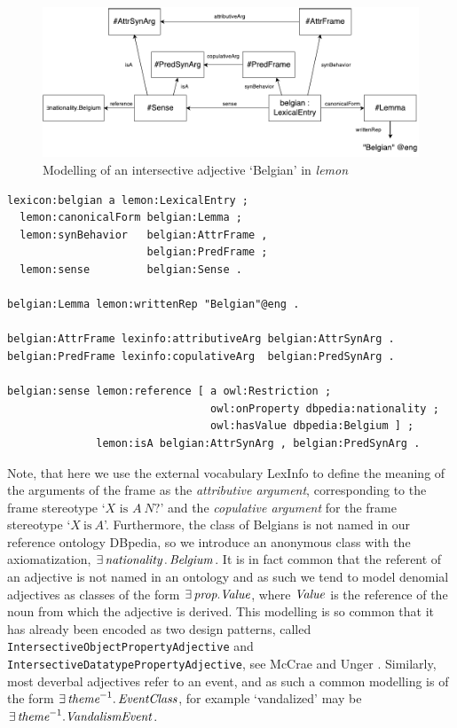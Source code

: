 \documentclass[11pt]{article}
\begin{document}
\begin{figure}
\includegraphics[width=\textwidth]{belgian-example}
\caption{Modelling of an intersective adjective `Belgian' in \emph{lemon}\label{example-belgian}}
\end{figure}

\begin{small}\begin{verbatim}
lexicon:belgian a lemon:LexicalEntry ;
  lemon:canonicalForm belgian:Lemma ;
  lemon:synBehavior   belgian:AttrFrame , 
                      belgian:PredFrame ;
  lemon:sense         belgian:Sense .

belgian:Lemma lemon:writtenRep "Belgian"@eng .

belgian:AttrFrame lexinfo:attributiveArg belgian:AttrSynArg .
belgian:PredFrame lexinfo:copulativeArg  belgian:PredSynArg .

belgian:sense lemon:reference [ a owl:Restriction ;
                                owl:onProperty dbpedia:nationality ;
                                owl:hasValue dbpedia:Belgium ] ;
              lemon:isA belgian:AttrSynArg , belgian:PredSynArg .
\end{verbatim}\end{small}

Note, that here we use the external vocabulary LexInfo \cite{cimiano2011lexinfo} 
to define the meaning of the arguments of the frame as the \emph{attributive 
argument}, corresponding to the frame stereotype `$X\text{ is }A~N?$' and the 
\emph{copulative argument} for the frame stereotype `$X\mathrm{~is~}A$'. Furthermore,
the class of Belgians is not named in our reference ontology DBpedia, so we 
introduce an anonymous class with the axiomatization, 
$\exists\,\text{\em nationality}\,.\,\text{\em Belgium}$. It is in fact common that the 
referent of an adjective is not named in an ontology and as such we tend to 
model denomial adjectives as classes of the form $\exists\,\text{\em prop}.\text{\em Value}$, 
where $\text{\em Value}$ is the reference of the noun from which the adjective is
derived. This modelling is so common that it has already been encoded as two
design patterns, called {\tt IntersectiveObjectPropertyAdjective} and {\tt
IntersectiveDatatypePropertyAdjective}, see McCrae and Unger .
Similarly, most deverbal adjectives refer to an event, and as such
a common modelling is of the form $\exists\,\text{\em theme}^{-1}.\,\text{\em EventClass}$, 
for example `vandalized' may be $\exists\,\text{\em theme}^{-1}.\text{\em VandalismEvent}$.
\end{document}
